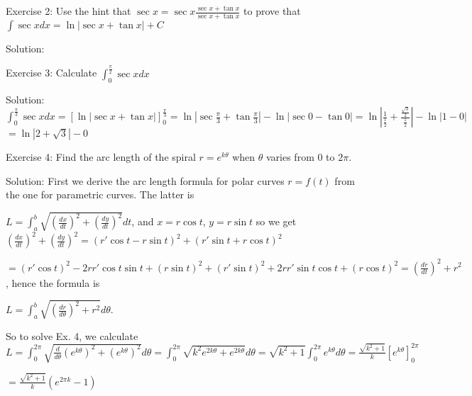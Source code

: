 Exercise 2: Use the hint that $\sec x=\sec x\frac{\sec x+\tan x}{\sec x+\tan x}$ to prove that $\int\sec xdx=\ln\left|\sec x+\tan x\right|+C$

Solution: 

Exercise 3: Calculate $\int_0^{\frac{\pi}{2}}\sec xdx$

Solution: $\int_0^{\frac{\pi}{3}}\sec xdx=\left[\ln\left|\sec x+\tan x\right|\right]^{\frac{\pi}{3}}_0=\ln\left|\sec\frac{\pi}{3}+\tan\frac{\pi}{3}\right|-\ln\left|\sec0-\tan0\right|=\ln\left|\frac{1}{\frac{1}{2}}+\frac{\frac{\sqrt{3}}{2}}{\frac{1}{2}}\right|-\ln\left|1-0\right|$
$=\ln\left|2+\sqrt{3}\right|-0$

Exercise 4: Find the arc length of the spiral $r=e^{k\theta}$ when $\theta$ varies from $0$ to $2\pi$.  

Solution: First we derive the arc length formula for polar curves $r=f\left(t\right)$ from the one for parametric curves. The latter is 

$L=\int_a^b\sqrt{\left(\frac{dx}{dt}\right)^2+\left(\frac{dy}{dt}\right)^2}dt$, and $x=r\cos t$, $y=r\sin t$ so we get $\left(\frac{dx}{dt}\right)^2+\left(\frac{dy}{dt}\right)^2=\left(r'\cos t-r\sin t\right)^2+\left(r'\sin t+r\cos t\right)^2$

$=\left(r'\cos t\right)^2-2rr'\cos t\sin t+\left(r\sin t\right)^2+\left(r'\sin t\right)^2+2rr'\sin t\cos t+\left(r\cos t\right)^2=\left(\frac{dr}{dt}\right)^2+r^2$, hence the formula is

$L=\int_a^b\sqrt{\left(\frac{dr}{d\theta}\right)^2+r^2}d\theta$.

So to solve Ex. 4, we calculate $L=\int_0^{2\pi}\sqrt{\frac{d}{d\theta}\left(e^{k\theta}\right)^2+\left(e^{k\theta}\right)^2}d\theta=\int_0^{2\pi}\sqrt{k^2e^{2k\theta}+e^{2k\theta}}d\theta=\sqrt{k^2+1}\int_0^{2\pi}e^{k\theta}d\theta=\frac{\sqrt{k^2+1}}{k}\left[e^{k\theta}\right]^{2\pi}_0$

$=\frac{\sqrt{k^2+1}}{k}\left(e^{2\pi k}-1\right)$